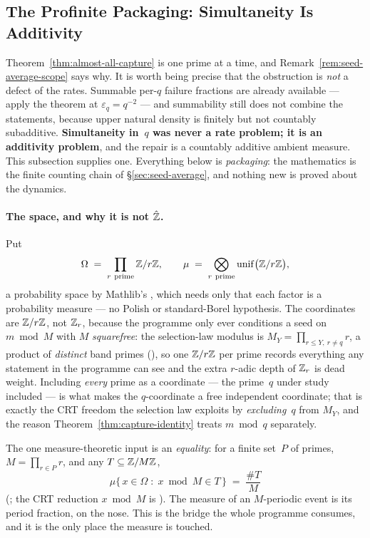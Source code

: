 \subsection{The Profinite Packaging: Simultaneity Is Additivity}
\label{sec:profinite}

Theorem~\ref{thm:almost-all-capture} is one prime at a time, and
Remark~\ref{rem:seed-average-scope} says why.  It is worth being precise
that the obstruction is \emph{not} a defect of the rates.  Summable per-$q$
failure fractions are already available --- apply the theorem at
$\varepsilon_q = q^{-2}$ --- and summability still does not combine the
statements, because upper natural density is finitely but not countably
subadditive.  \textbf{Simultaneity in~$q$ was never a rate problem; it is
an additivity problem}, and the repair is a countably additive ambient
measure.  This subsection supplies one.  Everything below is
\emph{packaging}: the mathematics is the finite counting chain of
\S\ref{sec:seed-average}, and nothing new is proved about the dynamics.

\paragraph{The space, and why it is not $\hat{\mathbb{Z}}$.}
Put
\[
  \Omega \;=\; \prod_{r\ \text{prime}} \mathbb{Z}/r\mathbb{Z} ,
  \qquad
  \mu \;=\; \bigotimes_{r\ \text{prime}} \mathrm{unif}\bigl(\mathbb{Z}/r\mathbb{Z}\bigr),
\]
a probability space by Mathlib's , which needs
only that each factor is a probability measure --- no Polish or
standard-Borel hypothesis.  The coordinates are $\mathbb{Z}/r\mathbb{Z}$, not $\mathbb{Z}_r$,
because the programme only ever conditions a seed on $m \bmod M$ with $M$
\emph{squarefree}: the selection-law modulus is
$M_Y = \prod_{r \le Y,\ r \neq q} r$, a product of \emph{distinct} band
primes (),
so one $\mathbb{Z}/r\mathbb{Z}$ per prime records everything any statement in the
programme can see and the extra $r$-adic depth of $\mathbb{Z}_r$ is dead weight.
Including \emph{every} prime as a coordinate --- the prime~$q$ under study
included --- is what makes the $q$-coordinate a free independent
coordinate; that is exactly the CRT freedom the selection law exploits by
\emph{excluding}~$q$ from $M_Y$, and the reason
Theorem~\ref{thm:capture-identity} treats $m \bmod q$ separately.

The one measure-theoretic input is an \emph{equality}: for a finite set~$P$
of primes, $M = \prod_{r \in P} r$, and any $T \subseteq \mathbb{Z}/M\mathbb{Z}$,
\[
  \mu\bigl\{\, x \in \Omega \;:\; x \bmod M \in T \,\bigr\}
    \;=\; \frac{\#T}{M}
\]
(;
the CRT reduction $x \bmod M$ is
).  The measure of an
$M$-periodic event is its period fraction, on the nose.  This is the
bridge the whole programme consumes, and it is the only place the measure
is touched.

